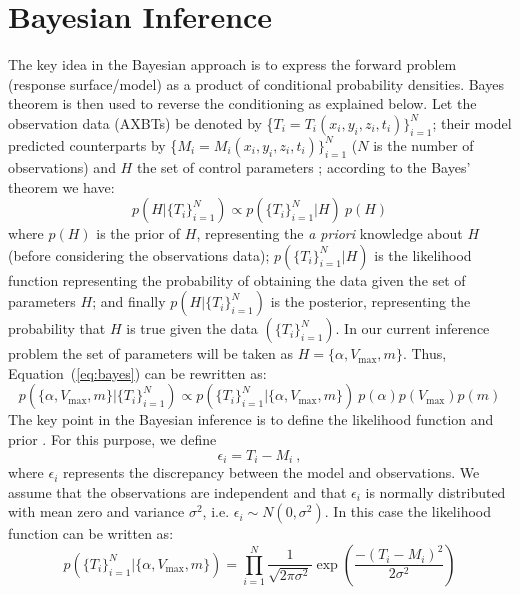 \section{Bayesian Inference}
 \label{sec:inference}


The key idea in the Bayesian approach is to express the 
forward problem (response surface/model)
as a product of conditional probability densities. Bayes theorem 
is then used to reverse the conditioning as explained below.  
Let the observation data (AXBTs) be denoted by \{$T_i = T_i(x_i,y_i,z_i,t_i)\}_{i=1}^N$;
their model predicted counterparts by \{$M_i= M_i(x_i,y_i,z_i,t_i)\}_{i=1}^N$
($N$ is the number of observations) and $H$ the set of control parameters ; 
according to the Bayes' theorem we have:
\begin{equation}
 p(H| \{T_i\}_{i=1}^N) \propto 
 p(\{T_i\}_{i=1}^N | H) \ p(H)  
\label{eq:bayes}
\end{equation}
where $p(H)$ is the prior of $H$, representing the \emph{a priori} knowledge
about $H$ (before considering the observations data); 
$p(\{T_i\}_{i=1}^N | H)$ is the likelihood function representing
the probability of obtaining the data given the set of parameters $H$;
and finally $p(H| \{ T_i \}_{i=1}^N)$ is the posterior,
representing the probability that $H$ is true given the data $( \{ T_i \}_{i=1}^N )$.
In our current inference problem the set of parameters will
be taken as $H = \{ \alpha, V_{\max}, m\}$. Thus, Equation~(\ref{eq:bayes}) can be rewritten as:
\begin{equation}
p(\{ \alpha, V_{\max}, m\} | \{ T_i \}_{i=1}^N)
\propto 
p(\{T_i\}_{i=1}^N | \{ \alpha, V_{\max}, m\}) \ p(\alpha)p(V_{\max}) p(m)  
\end{equation}
The key point in the Bayesian inference is to define the likelihood function and 
prior \citep{sivia}. For this purpose, we define
\begin{equation} 
	 \epsilon_i = T_i - M_i \ ,
\end{equation}
where $\epsilon_i$ represents the discrepancy between the model and observations. 
We assume
that the observations are independent
and that $\epsilon_i$ is normally distributed with mean
zero and variance $\sigma^2$, i.e. 
$\epsilon_i \sim N(0,\sigma^2)$. In this 
case the likelihood function can be written as:
\begin{equation} 
p(\{T_i\}_{i=1}^N | \{ \alpha, V_{\max}, m\}) 
= 
\prod_{i=1}^N  \frac{1}{\sqrt{2 \pi \sigma^2}} 
\exp \left( \frac{-(T_i - M_i)^2}{2 \sigma^2} \right)  	
\label{eq:likelihood}
\end{equation}

